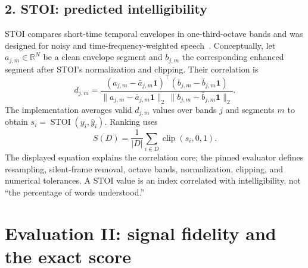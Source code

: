 \documentclass[11pt,letterpaper]{article}
\newcommand{\page}[1]{\clearpage\section{#1}}
\newcommand{\R}{\mathbb{R}}
\newcommand{\clip}{\operatorname{clip}}
\begin{document}
\subsection{2. STOI: predicted intelligibility}
STOI compares short-time temporal envelopes in one-third-octave bands and was designed for noisy and time-frequency-weighted speech~\cite{stoi}. Conceptually, let $a_{j,m}\in\R^N$ be a clean envelope segment and $b_{j,m}$ the corresponding enhanced segment after STOI's normalization and clipping. Their correlation is
\begin{equation}
d_{j,m}=\frac{(a_{j,m}-\bar a_{j,m}\mathbf1)^\top(b_{j,m}-\bar b_{j,m}\mathbf1)}
{\|a_{j,m}-\bar a_{j,m}\mathbf1\|_2\,\|b_{j,m}-\bar b_{j,m}\mathbf1\|_2}.
\end{equation}
The implementation averages valid $d_{j,m}$ values over bands $j$ and segments $m$ to obtain $s_i=\operatorname{STOI}(y_i,\hat y_i)$. Ranking uses
\begin{equation}
S(D)=\frac1{|D|}\sum_{i\in D}\clip(s_i,0,1).
\end{equation}
The displayed equation explains the correlation core; the pinned evaluator defines resampling, silent-frame removal, octave bands, normalization, clipping, and numerical tolerances. A STOI value is an index correlated with intelligibility, not ``the percentage of words understood.''

\begin{center}
\end{center}

\page{Evaluation II: signal fidelity and the exact score}
\end{document}
